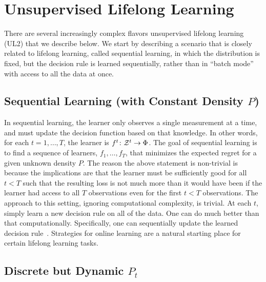 \documentclass{article}
\begin{document}






\section{Unsupervised Lifelong Learning}
\label{sec:continual}

There are several increasingly complex flavors unsupervised lifelong learning (UL2) that we describe below.  We start by describing a scenario that is closely related to lifelong learning, called sequential learning, in which the distribution is fixed, but the decision rule is learned sequentially, rather than in ``batch mode'' with access to all the data at once. 



\subsection{Sequential Learning (with Constant Density $P$)}
\label{sec:constant}


In sequential learning, the learner only observes a single measurement at a time, and must update the decision function based on that knowledge.  In other words, for each $t = 1,\ldots, T$, the learner is $f^t {\colon} \mathcal{Z}^t \to \Phi$.  
%  
The goal of sequential learning is to find a sequence of learners, $f_1, \ldots, f_T$, that minimizes the expected regret for a given unknown density $P$.  The reason the above statement is non-trivial is because the implications are that the learner must be sufficiently good for all $t<T$ such that the resulting loss is not much more than it would have been if the learner had access to all $T$ observations even for the first $t<T$ observations.
% 
The approach to this setting, ignoring computational complexity, is trivial.  At each $t$, simply learn a new decision rule on all of the data. One can do much better than that computationally.  Specifically, one can sequentially update the learned decision rule~\cite{Xiao2010}. Strategies for online learning are a natural starting place for certain lifelong learning tasks.



\subsection{Discrete but Dynamic $P_t$}
\label{sec:jumps}
\end{document}
